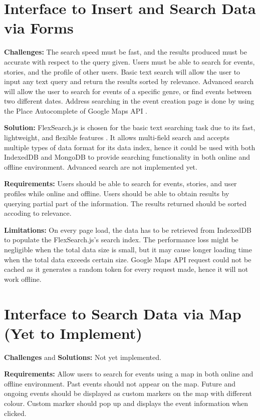 \documentclass[11pt, a4paper]{article}
\begin{document}
\section{Interface to Insert and Search Data via Forms}
\textbf{Challenges:} The search speed must be fast, and the results produced must be accurate with
respect to the query given. Users must be able to search for events, stories, and the profile of
other users. Basic text search will allow the user to input any text query and return the results
sorted by relevance. Advanced search will allow the user to search for events of a specific genre,
or find events between two different dates. Address searching in the event creation page is done by
using the Place Autocomplete of Google Maps API \cite{google_maps_api}.

\textbf{Solution:} FlexSearch.js \cite{flexsearch} is chosen for the basic text searching task due
to its fast, lightweight, and flexible features \cite{flexsearch_benchmarkk}. It allows multi-field
search and accepts multiple types of data format for its data index, hence it could be used with
both IndexedDB and MongoDB to provide searching functionality in both online and offline
environment. Advanced search are not implemented yet.

\textbf{Requirements:} Users should be able to search for events, stories, and user profiles while
online and offline. Users should be able to obtain results by querying partial part of the
information. The results returned should be sorted accoding to relevance.

\textbf{Limitations:} On every page load, the data has to be retrieved from IndexedDB to populate
the FlexSearch.js's search index. The performance loss might be negligible when the total data size
is small, but it may cause longer loading time when the total data exceeds certain size. Google Maps
API request could not be cached as it generates a random token for every request made, hence it will
not work offline.

\section{Interface to Search Data via Map (Yet to Implement)}
\textbf{Challenges} and \textbf{Solutions:} Not yet implemented.

\textbf{Requirements:} Allow users to search for events using a map in both online and offline
environment. Past events should not appear on the map. Future and ongoing events should be displayed
as custom markers on the map with different colour. Custom marker should pop up and displays the
event information when clicked.
\end{document}
